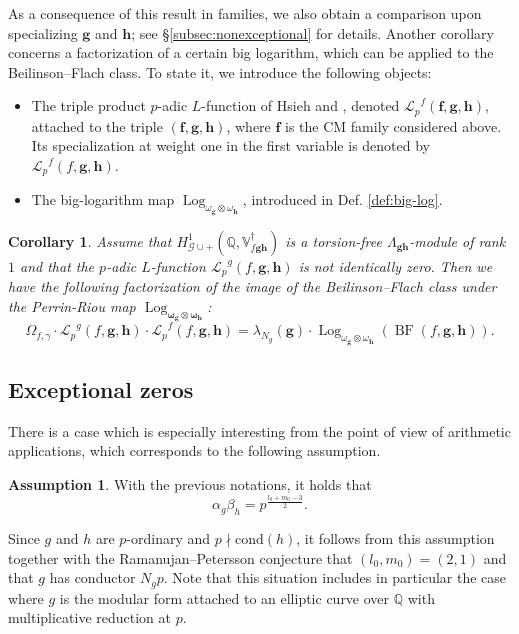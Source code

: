\documentclass[a4paper,11pt]{amsart}
\theoremstyle{plain}
\newtheorem{corollary}[theorem]{Corollary}
\theoremstyle{definition}
\newtheorem{ass}[theorem]{Assumption}
\theoremstyle{remark}
\newcommand{\bb}{\mathbb}
\newcommand{\cl}{\mathcal}
\DeclareMathOperator{\BF}{BF}
\DeclareMathOperator{\Log}{Log}
\newcommand{\Lp}{{\mathscr{L}_p}}
\newcommand{\hf}{{\mathbf{f}}}
\newcommand{\hg}{{\mathbf{g}}}
\newcommand{\hh}{{\mathbf h}}
\numberwithin{equation}{section}
\begin{document}
As a consequence of this result in families, we also obtain a comparison upon specializing $\hg$ and $\hh$; see \S\ref{subsec:nonexceptional} for details. Another corollary concerns a factorization of a certain big logarithm, which can be applied to the Beilinson--Flach class. To state it, we introduce the following objects:
\begin{itemize}
    \item[-] The triple product $p$-adic $L$-function of Hsieh \cite{Hs} and \cite{AI}, denoted $\Lp^f(\hf,\hg,\hh)$, attached to the triple $(\hf,\hg,\hh)$, where $\hf$ is the CM family considered above. Its specialization at weight one in the first variable is denoted by $\Lp^f(f,\hg,\hh)$.
    \item[-] The big-logarithm map $\Log_{\omega_{\hg} \otimes \omega_{\hh}}$, introduced in Def. \ref{def:big-log}.
\end{itemize}


\begin{corollary}
Assume that $H^1_{\cl{G}\cup +}(\bb{Q}, \bb{V}_{f\hg\hh}^\dagger)$ is a torsion-free $\Lambda_{\hg\hh}$-module of rank $1$ and that the $p$-adic $L$-function $\Lp^g(f,\hg,\hh)$ is not identically zero. Then we have the following factorization of the image of the Beilinson--Flach class under the Perrin-Riou map $\Log_{\bm{\omega}_{\hg} \otimes \bm{\omega}_{\hh}}$: \[ \Omega_{f,\gamma} \cdot \Lp^g(f,\hg,\hh) \cdot \Lp^f(f, \hg, \hh) =  \lambda_{N_g}(\hg) \cdot \Log_{\omega_{\hg} \otimes \omega_{\hh}}(\BF(f, \hg, \hh)). \] 
\end{corollary}


\subsection{Exceptional zeros}

There is a case which is especially interesting from the point of view of arithmetic applications, which corresponds to the following assumption.

\begin{ass}
With the previous notations, it holds that \[ \alpha_g \beta_h = p^{\frac{l_0+m_0-3}{2}}. \] 
\end{ass}

Since $g$ and $h$ are $p$-ordinary and $p\nmid \mathrm{cond}(h)$, it follows from this assumption together with the Ramanujan--Petersson conjecture that $(l_0,m_0)=(2,1)$ and that $g$ has conductor $N_gp$. Note that this situation includes in particular the case where $g$ is the modular form attached to an elliptic curve over $\bb{Q}$ with multiplicative reduction at $p$.
\end{document}
